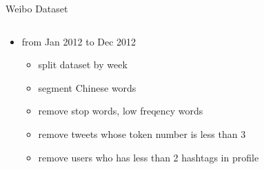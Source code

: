 \documentclass{beamer}
\begin{document}
\begin{frame}
\begin{columns}[T]
\begin{column}{.46\textwidth}
{\begin{block}{Weibo Dataset}
        \begin{columns}
                \begin{column}{.55\textwidth}
                        \begin{itemize}
                                \item \footnotesize{from Jan 2012 to Dec 2012}
                                \begin{itemize}
                                        \item \footnotesize{split dataset by week}
                                        \item \footnotesize{segment Chinese words}
                                        \item \footnotesize{remove stop words, low freqency words}
                                        \item \footnotesize{remove tweets whose token number is less than 3}
                                        \item \footnotesize{remove users who has less than 2 hashtags in profile}
                                \end{itemize}
                        \end{itemize}
                \end{column}
                \begin{column}{.45\textwidth}
                        \begin{table}
                                \centering
                                \caption{\scriptsize{statistics of processed dataset}}
\end{table}
\end{column}
\end{columns}
\end{block}}
\end{column}
\end{columns}
\end{frame}
\end{document}
